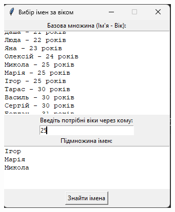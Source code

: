 \documentclass[12pt,a4paper]{article}
\begin{document}
\begin{figure}[htbp]
\begin{subfigure}{0.33\textwidth}
            \includegraphics[width=\linewidth]{ex1.png}
            \label{fig1:b}
        \end{subfigure}


\end{figure}
\end{document}
